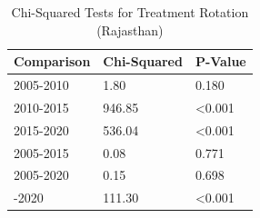 \begin{table}[!h]
\centering
\caption{\label{tab:chi_sq_raj}Chi-Squared Tests for Treatment Rotation (Rajasthan)}
\centering
\fontsize{8}{10}\selectfont
\begin{tabular}[t]{lll}
\toprule
Comparison & Chi-Squared & P-Value\\
\midrule
2005-2010 & 1.80 & 0.180\\
2010-2015 & 946.85 & <0.001\\
2015-2020 & 536.04 & <0.001\\
2005-2015 & 0.08 & 0.771\\
2005-2020 & 0.15 & 0.698\\
\addlinespace
2010-2020 & 111.30 & <0.001\\
\bottomrule
\end{tabular}
\end{table}
